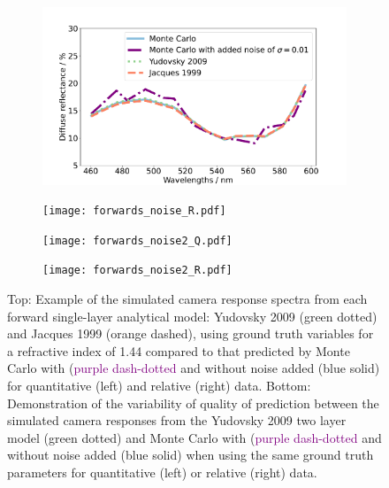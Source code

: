 \begin{figure}[h!]
    \centering
    \begin{subfigure}{0.49\textwidth}
        \includegraphics[width=\textwidth]{forwards_noise_Q.pdf}
        \caption{}
        \label{fig:egforwardsnoiseQ}
    \end{subfigure}
    \begin{subfigure}{0.49\textwidth}
        \texttt{[image: forwards\_noise\_R.pdf]}
        \caption{}
        \label{fig:egforwardsnoiseR}
    \end{subfigure}
    \begin{subfigure}{0.49\textwidth}
        \texttt{[image: forwards\_noise2\_Q.pdf]}
        \caption{}
        \label{fig:egforwards2noiseQ}
    \end{subfigure}
    \begin{subfigure}{0.49\textwidth}
        \texttt{[image: forwards\_noise2\_R.pdf]}
        \caption{}
        \label{fig:egforwards2noiseR}
    \end{subfigure}
    \caption{Top: Example of the simulated camera response spectra from each forward single-layer analytical model: Yudovsky 2009 (\textcolor{MyGreen}{green dotted}) and Jacques 1999 (\textcolor{MyOrange}{orange dashed}), using ground truth variables for a refractive index of 1.44 compared to that predicted by Monte Carlo with (\textcolor{purple}{purple dash-dotted} and without noise added (\textcolor{MyBlue}{blue solid}) for quantitative (left) and relative (right) data. Bottom: Demonstration of the variability of quality of prediction between the simulated camera responses from the Yudovsky 2009 two layer model (\textcolor{MyGreen}{green dotted}) and Monte Carlo with (\textcolor{purple}{purple dash-dotted} and without noise added (\textcolor{MyBlue}{blue solid}) when using the same ground truth parameters for quantitative (left) or relative (right) data.}
    \label{fig:forwardsHSIMC}
\end{figure}

